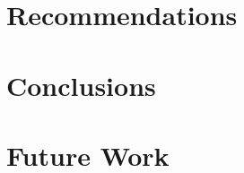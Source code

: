 \documentclass[letterpaper,twocolumn,10pt]{article}
\begin{document}
\section{Recommendations}



\section{Conclusions}




\section{Future Work}




  {\normalsize 
  }

\end{document}

